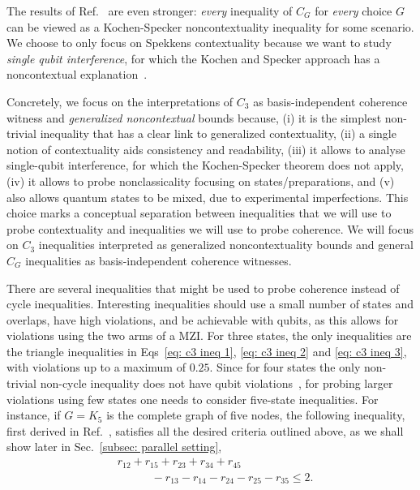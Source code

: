 \documentclass[a4paper,twocolumn,11pt,accepted=2024-01-17]{quantumarticle}
\begin{document}
The results of Ref.~\cite{wagner2022inequalities} are even stronger: \textit{every} inequality of $C_G$ for \textit{every} choice $G$ can be viewed as a Kochen-Specker noncontextuality inequality for some scenario. We choose to only focus on Spekkens contextuality because we want to study \textit{single qubit interference}, for which the Kochen and Specker approach has a noncontextual explanation~\cite{KochenS67}. 

Concretely, we focus on the interpretations of $C_3$ as basis-independent coherence witness and \textit{generalized noncontextual} bounds because, (i) it is the simplest non-trivial inequality that has a clear link to generalized contextuality, (ii) a single notion of contextuality aids consistency and readability, (iii) it allows to analyse single-qubit interference, for which the Kochen-Specker theorem does not apply, (iv) { it allows } to probe nonclassicality focusing on states/preparations, and (v) {  also allows} quantum states to be mixed, due to experimental imperfections. This choice marks a conceptual separation between inequalities that we will use to probe contextuality and inequalities we will use to probe coherence. We will focus on $C_3$ inequalities interpreted as generalized noncontextuality bounds and general $C_G$ inequalities as basis-independent coherence witnesses. 

There are several inequalities that might be used to probe coherence instead of cycle inequalities. Interesting inequalities should use a small number of states and overlaps, have high violations, and be achievable with qubits, as this allows for violations using the two arms of a MZI. For three states, the only inequalities are the triangle inequalities in Eqs~\eqref{eq: c3 ineq 1}, \eqref{eq: c3 ineq 2} and \eqref{eq: c3 ineq 3},
with violations up to a maximum of $0.25$. Since for four states the only non-trivial non-cycle inequality does not have qubit violations~\cite{wagner2022inequalities}, for probing larger violations using few states one needs to consider five-state inequalities. For instance, if $G = K_5$ is the complete graph of five nodes, the following inequality{, first derived in Ref.~\cite{wagner2022inequalities},} satisfies all the desired criteria { outlined above}, as we shall show later { in Sec.~\ref{subsec: parallel setting}},
\begin{align}
    &r_{12}+r_{15}+r_{23}+r_{34}+r_{45}\nonumber\\
    &\hspace{3em}-r_{13}-r_{14}-r_{24}-r_{25}-r_{35}\leq 2. \label{eq: inequality (d)}
\end{align}
\end{document}
